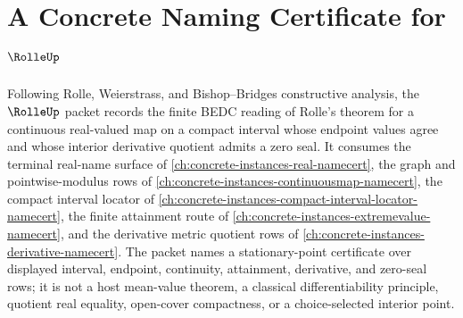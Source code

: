 \chapter{A Concrete Naming Certificate for $\RolleUp$}
\label{ch:concrete-instances-rolle-namecert}

Following Rolle, Weierstrass, and Bishop--Bridges constructive analysis, the $\RolleUp$ packet records the finite BEDC reading of Rolle's theorem for a continuous real-valued map on a compact interval whose endpoint values agree and whose interior derivative quotient admits a zero seal. It consumes the terminal real-name surface of \autoref{ch:concrete-instances-real-namecert}, the graph and pointwise-modulus rows of \autoref{ch:concrete-instances-continuousmap-namecert}, the compact interval locator of \autoref{ch:concrete-instances-compact-interval-locator-namecert}, the finite attainment route of \autoref{ch:concrete-instances-extremevalue-namecert}, and the derivative metric quotient rows of \autoref{ch:concrete-instances-derivative-namecert}. The packet names a stationary-point certificate over displayed interval, endpoint, continuity, attainment, derivative, and zero-seal rows; it is not a host mean-value theorem, a classical differentiability principle, quotient real equality, open-cover compactness, or a choice-selected interior point.

